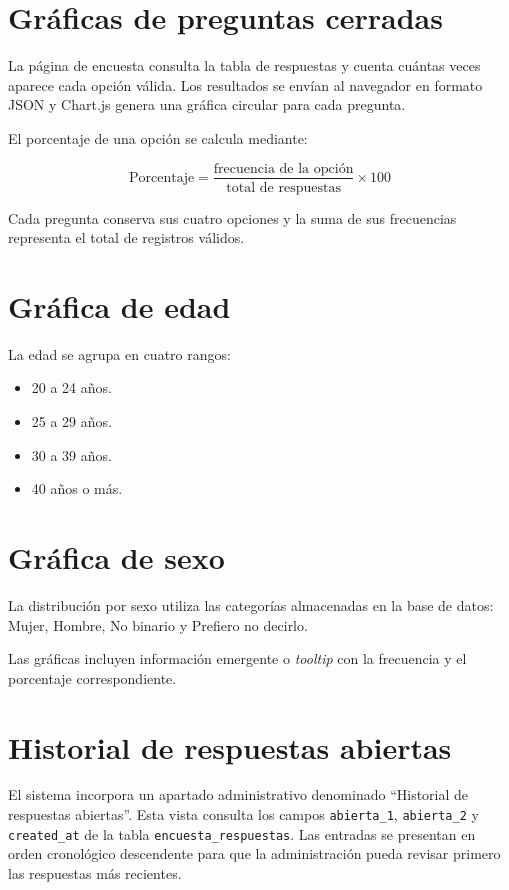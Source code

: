 \documentclass[12pt,letterpaper,oneside]{extreport}
\begin{document}
\section{Gráficas de preguntas cerradas}

La página de encuesta consulta la tabla de respuestas y cuenta cuántas veces aparece cada opción válida. Los resultados se envían al navegador en formato JSON y Chart.js genera una gráfica circular para cada pregunta.

El porcentaje de una opción se calcula mediante:

\[
\text{Porcentaje} = \frac{\text{frecuencia de la opción}}{\text{total de respuestas}} \times 100
\]

Cada pregunta conserva sus cuatro opciones y la suma de sus frecuencias representa el total de registros válidos.

\section{Gráfica de edad}

La edad se agrupa en cuatro rangos:

\begin{itemize}
    \item 20 a 24 años.
    \item 25 a 29 años.
    \item 30 a 39 años.
    \item 40 años o más.
\end{itemize}

\section{Gráfica de sexo}

La distribución por sexo utiliza las categorías almacenadas en la base de datos: Mujer, Hombre, No binario y Prefiero no decirlo.

Las gráficas incluyen información emergente o \textit{tooltip} con la frecuencia y el porcentaje correspondiente.

\section{Historial de respuestas abiertas}

El sistema incorpora un apartado administrativo denominado ``Historial de respuestas abiertas''. Esta vista consulta los campos \texttt{abierta\_1}, \texttt{abierta\_2} y \texttt{created\_at} de la tabla \texttt{encuesta\_respuestas}. Las entradas se presentan en orden cronológico descendente para que la administración pueda revisar primero las respuestas más recientes.
\end{document}
